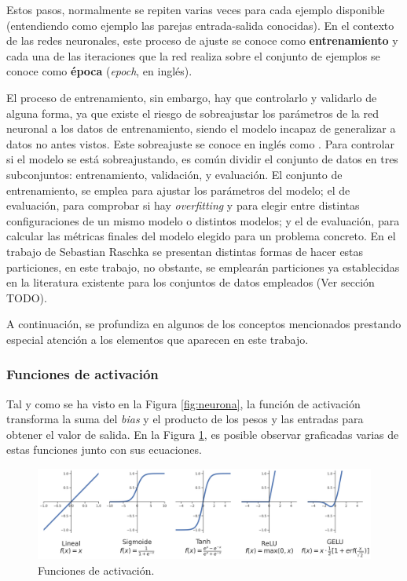 Estos pasos, normalmente se repiten varias veces para cada ejemplo disponible (entendiendo como ejemplo las parejas entrada-salida conocidas). En el contexto de las redes neuronales, este proceso de ajuste se conoce como \textbf{entrenamiento} y cada una de las iteraciones que la red realiza sobre el conjunto de ejemplos se conoce como \textbf{época} (\textit{epoch}, en inglés). 

El proceso de entrenamiento, sin embargo, hay que controlarlo y validarlo de alguna forma, ya que existe el riesgo de sobreajustar los parámetros de la red neuronal a los datos de entrenamiento, siendo el modelo incapaz de generalizar a datos no antes vistos. Este sobreajuste se conoce en inglés como . Para controlar si el modelo se está sobreajustando, es común dividir el conjunto de datos en tres subconjuntos: entrenamiento, validación, y evaluación. El conjunto de entrenamiento, se emplea para ajustar los parámetros del modelo; el de evaluación, para comprobar si hay \textit{overfitting} y para elegir entre distintas configuraciones de un mismo modelo o distintos modelos; y el de evaluación, para calcular las métricas finales del modelo elegido para un problema concreto. En el trabajo de Sebastian Raschka \cite{model-evaluation} se presentan distintas formas de hacer estas particiones, en este trabajo, no obstante, se emplearán particiones ya establecidas en la literatura existente para los conjuntos de datos empleados (Ver sección TODO).


A continuación, se profundiza en algunos de los conceptos mencionados prestando especial atención a los elementos que aparecen en este trabajo.

\subsubsection{Funciones de activación}
Tal y como se ha visto en la Figura \ref{fig:neurona}, la función de activación transforma la suma del \textit{bias} y el producto de los pesos y las entradas para obtener el valor de salida. En la Figura \ref{fig:funciones-activacion}, es posible observar graficadas varias de estas funciones junto con sus ecuaciones.

\begin{figure}[H]
\centering
\includegraphics[width=\linewidth]{imagenes/funciones_activacion.png} 
\captionsetup{width=.8\linewidth}
\caption{Funciones de activación.}
\label{fig:funciones-activacion}
\end{figure}

